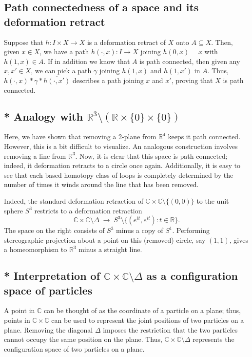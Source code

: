 \documentclass[11pt]{article}
\def\C{\mathbb{C}}
\def\R{\mathbb{R}}
\theoremstyle{definition}
\theoremstyle{remark}
\begin{document}
    \subsection*{Path connectedness of a space and its deformation retract}

    Suppose that $h\colon I \times X \to X$ is a deformation retract of $X$ onto
    $A\subseteq X$. Then, given $x \in X$, we have a path $h(\cdot, x)\colon I \to X$
    joining $h(0, x) = x$ with $h(1, x) \in A$. If in addition we know that $A$ is
    path connected, then given any $x, x' \in X$, we can pick a path $\gamma$ joining
    $h(1, x)$ and $h(1, x')$ in $A$. Thus, $h(\cdot, x) * \gamma * \overline{h(\cdot,
    x')}$ describes a path joining $x$ and $x'$, proving that $X$ is path connected.


    \subsection*{* Analogy with $\R^3\setminus(\R\times \{0\}\times\{0\})$}

    Here, we have shown that removing a 2-plane from $\R^4$ keeps it path connected.
    However, this is a bit difficult to visualize. An analogous construction involves
    removing a line from $\R^3$. Now, it is clear that this space is path connected;
    indeed, it deformation retracts to a circle once again. Additionally, it is easy
    to see that each based homotopy class of loops is completely determined by the
    number of times it winds around the line that has been removed.

    Indeed, the standard deformation retraction of $\C\times \C\setminus \{(0, 0)\}$
    to the unit sphere $S^3$ restricts to a deformation retraction \[
        \C\times\C\setminus\Delta \;\to\; S^3\setminus\{(e^{it}, e^{it}): t \in \R\}.
    \] The space on the right consists of $S^3$ minus a copy of $S^1$. Performing
    stereographic projection about a point on this (removed) circle, say $(1, 1)$,
    gives a homeomorphism to $\R^3$ minus a straight line.


    \subsection*{* Interpretation of $\C\times\C \setminus\Delta$ as a configuration
    space of particles}

    A point in $\C$ can be thought of as the coordinate of a particle on a plane;
    thus, points in $\C\times\C$ can be used to represent the joint positions of two
    particles on a plane. Removing the diagonal $\Delta$ imposes the restriction that
    the two particles cannot occupy the same position on the plane. Thus,
    $\C\times\C\setminus\Delta$ represents the configuration space of two particles
    on a plane.
\end{document}
